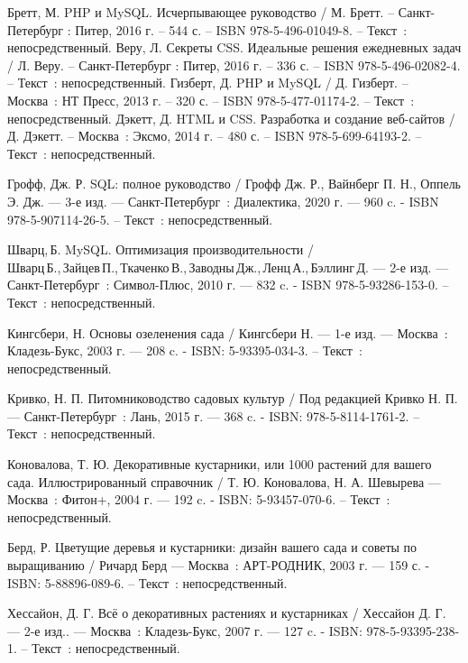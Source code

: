 
\begin{thebibliography}{9}

     Бретт, М. PHP и MySQL. Исчерпывающее руководство / М. Бретт. – Санкт-Петербург : Питер, 2016 г. – 544 с. – ISBN 978-5-496-01049-8. – Текст~: непосредственный.
     Веру, Л. Секреты CSS. Идеальные решения ежедневных задач / Л. Веру. – Санкт-Петербург : Питер, 2016 г. – 336 с. – ISBN 978-5-496-02082-4. – Текст~: непосредственный.
    	Гизберт, Д. PHP и MySQL / Д. Гизберт. – Москва~: НТ Пресс, 2013 г. – 320 с. – ISBN 978-5-477-01174-2. – Текст~: непосредственный.
		Дэкетт, Д. HTML и CSS. Разработка и создание веб-сайтов / Д. Дэкетт. – Москва~: Эксмо, 2014 г. – 480 с. – ISBN 978-5-699-64193-2. – Текст~: непосредственный.
	
	
	 Грофф, Дж. Р. SQL: полное руководство / Грофф Дж. Р., Вайнберг П. Н., Оппель Э. Дж. — 3-е изд. — Санкт-Петербург~: Диалектика, 2020 г. — 960 c. - ISBN 978-5-907114-26-5. – Текст~: непосредственный.
	
	 Шварц, Б. MySQL. Оптимизация производительности  / Шварц Б., Зайцев П., Ткаченко В., Заводны Дж., Ленц А., Бэллинг Д. — 2-е изд. — Санкт-Петербург~: Символ-Плюс, 2010 г. — 832 c. - ISBN 978-5-93286-153-0. – Текст~: непосредственный.
	
	 Кингсбери, Н. Основы озеленения сада  / Кингсбери Н. — 1-е изд. — Москва~: Кладезь-Букс, 2003 г. — 208 c. - ISBN: 5-93395-034-3. – Текст~: непосредственный.
	
	 Кривко, Н. П. Питомниководство садовых культур  / Под редакцией Кривко Н. П. — Санкт-Петербург~: Лань, 2015 г. — 368 c. - ISBN: 978-5-8114-1761-2. – Текст~: непосредственный.
	
	 Коновалова, Т. Ю. Декоративные кустарники, или 1000 растений для вашего сада. Иллюстрированный справочник / Т. Ю. Коновалова, Н. А. Шевырева — Москва~: Фитон+, 2004 г. — 192 c. - ISBN: 5-93457-070-6. – Текст~: непосредственный.
	
	 Берд, Р. Цветущие деревья и кустарники: дизайн вашего сада и советы по выращиванию  / Ричард Берд — Москва~: АРТ-РОДНИК, 2003 г. — 159 с. - ISBN: 5-88896-089-6.  – Текст~: непосредственный.
	
	 Хессайон, Д. Г. Всё о декоративных растениях и кустарниках  / Хессайон Д. Г.   — 2-е изд.. — Москва~: Кладезь-Букс, 2007 г. — 127 c. - ISBN: 978-5-93395-238-1. – Текст~: непосредственный.
	

\end{thebibliography}
